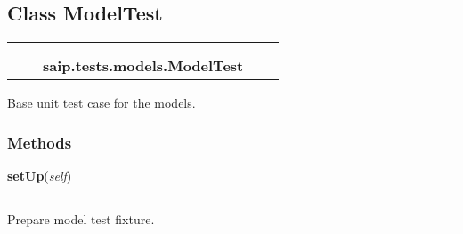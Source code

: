 \subsection{Class ModelTest}

    \label{saip:tests:models:ModelTest}
\begin{tabular}{cccccc}
\multicolumn{2}{r}{\settowidth{\BCL}{object}\multirow{2}{\BCL}{object}}
&&
  \\\cline{3-3}
  &&\multicolumn{1}{c|}{}
&&
  \\
&&\multicolumn{2}{l}{\textbf{saip.tests.models.ModelTest}}
\end{tabular}

Base unit test case for the models.



  \subsubsection{Methods}

    \label{saip:tests:models:ModelTest:setUp}

    \vspace{0.5ex}

\hspace{.8\funcindent}\begin{boxedminipage}{\funcwidth}

    \raggedright \textbf{setUp}(\textit{self})

    \vspace{-1.5ex}

    \rule{\textwidth}{0.5\fboxrule}
\setlength{\parskip}{2ex}
    Prepare model test fixture.

\setlength{\parskip}{1ex}
    \end{boxedminipage}

    \label{saip:tests:models:ModelTest:tearDown}

